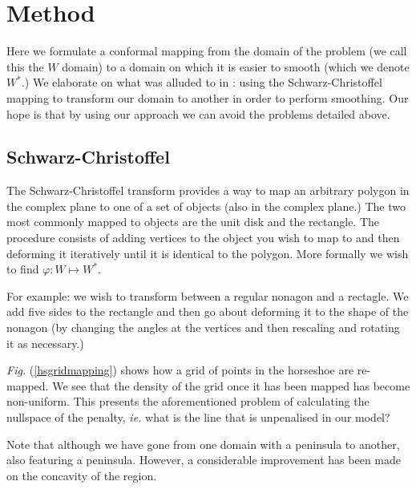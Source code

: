 \documentclass[a4paper,10pt]{amsart}
\newcommand{\sch}{Schwarz-Christoffel }
\newcommand{\Fig}[1]{\emph{Fig.} (\ref{#1})}
\renewcommand{\phi}{\varphi}
\begin{document}
\section{Method}

Here we formulate a conformal mapping from the domain of the problem (we call this the $W$ domain) to a domain on which it is easier to smooth (which we denote $W^*$.) We elaborate on what was alluded to in \cite{eilerstalk}: using the \sch mapping to transform our domain to another in order to perform smoothing. Our hope is that by using our approach we can avoid the problems detailed above.

\subsection{\sch}

The \sch transform provides a way to map an arbitrary polygon in the complex plane to one of a set of objects (also in the complex plane.) The two most commonly mapped to objects are the unit disk and the rectangle. The procedure consists of adding vertices to the object you wish to map to and then deforming it iteratively until it is identical to the polygon. More formally we wish to find $\phi: W \mapsto W^*$.

For example: we wish to transform between a regular nonagon and a rectagle. We add five sides to the rectangle and then go about deforming it to the shape of the nonagon (by changing the angles at the vertices and then rescaling and rotating it as necessary.) 

\Fig{hsgridmapping} shows how a grid of points in the horseshoe are re-mapped. We see that the density of the grid once it has been mapped has become non-uniform. This presents the aforementioned problem of calculating the nullspace of the penalty, \emph{ie.} what is the line that is unpenalised in our model?

Note that although we have gone from one domain with a peninsula to another, also featuring a peninsula. However, a considerable improvement has been made on the concavity of the region. 
\end{document}
